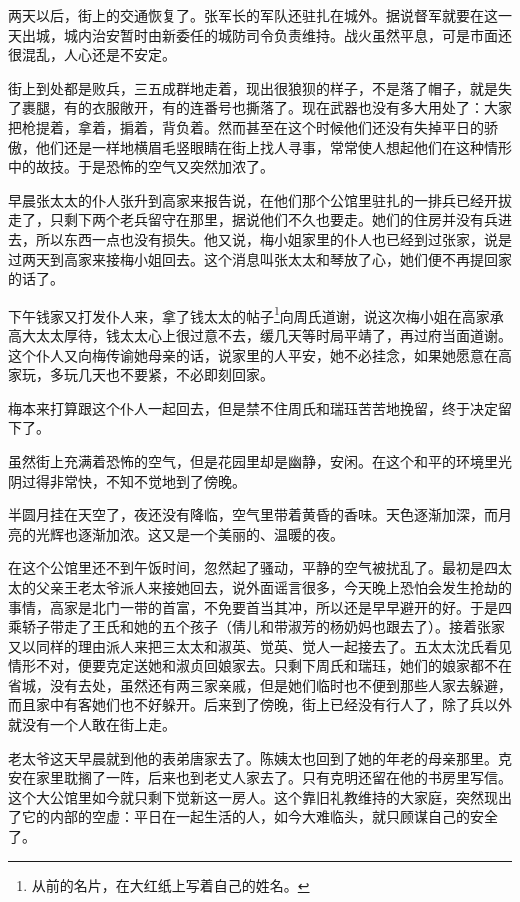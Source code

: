 \par 两天以后，街上的交通恢复了。张军长的军队还驻扎在城外。据说督军就要在这一天出城，城内治安暂时由新委任的城防司令负责维持。战火虽然平息，可是市面还很混乱，人心还是不安定。
\par 街上到处都是败兵，三五成群地走着，现出很狼狈的样子，不是落了帽子，就是失了裹腿，有的衣服敞开，有的连番号也撕落了。现在武器也没有多大用处了：大家把枪提着，拿着，掮着，背负着。然而甚至在这个时候他们还没有失掉平日的骄傲，他们还是一样地横眉毛竖眼睛在街上找人寻事，常常使人想起他们在这种情形中的故技。于是恐怖的空气又突然加浓了。
\par 早晨张太太的仆人张升到高家来报告说，在他们那个公馆里驻扎的一排兵已经开拔走了，只剩下两个老兵留守在那里，据说他们不久也要走。她们的住房并没有兵进去，所以东西一点也没有损失。他又说，梅小姐家里的仆人也已经到过张家，说是过两天到高家来接梅小姐回去。这个消息叫张太太和琴放了心，她们便不再提回家的话了。
\par 下午钱家又打发仆人来，拿了钱太太的帖子\footnote{从前的名片，在大红纸上写着自己的姓名。}向周氏道谢，说这次梅小姐在高家承高大太太厚待，钱太太心上很过意不去，缓几天等时局平靖了，再过府当面道谢。这个仆人又向梅传谕她母亲的话，说家里的人平安，她不必挂念，如果她愿意在高家玩，多玩几天也不要紧，不必即刻回家。
\par 梅本来打算跟这个仆人一起回去，但是禁不住周氏和瑞珏苦苦地挽留，终于决定留下了。
\par 虽然街上充满着恐怖的空气，但是花园里却是幽静，安闲。在这个和平的环境里光阴过得非常快，不知不觉地到了傍晚。
\par 半圆月挂在天空了，夜还没有降临，空气里带着黄昏的香味。天色逐渐加深，而月亮的光辉也逐渐加浓。这又是一个美丽的、温暖的夜。
\par 在这个公馆里还不到午饭时间，忽然起了骚动，平静的空气被扰乱了。最初是四太太的父亲王老太爷派人来接她回去，说外面谣言很多，今天晚上恐怕会发生抢劫的事情，高家是北门一带的首富，不免要首当其冲，所以还是早早避开的好。于是四乘轿子带走了王氏和她的五个孩子（倩儿和带淑芳的杨奶妈也跟去了）。接着张家又以同样的理由派人来把三太太和淑英、觉英、觉人一起接去了。五太太沈氏看见情形不对，便要克定送她和淑贞回娘家去。只剩下周氏和瑞珏，她们的娘家都不在省城，没有去处，虽然还有两三家亲戚，但是她们临时也不便到那些人家去躲避，而且家中有客她们也不好躲开。后来到了傍晚，街上已经没有行人了，除了兵以外就没有一个人敢在街上走。
\par 老太爷这天早晨就到他的表弟唐家去了。陈姨太也回到了她的年老的母亲那里。克安在家里耽搁了一阵，后来也到老丈人家去了。只有克明还留在他的书房里写信。这个大公馆里如今就只剩下觉新这一房人。这个靠旧礼教维持的大家庭，突然现出了它的内部的空虚：平日在一起生活的人，如今大难临头，就只顾谋自己的安全了。
